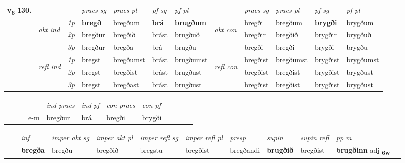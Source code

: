 \begin{tabular}{llllllllllll} \toprule
\multirow{4}{*}{{{\textbf{v{\textsubscript{6}}} \Large{\textbf{130.}}}}}  & &   &  \textit{praes sg}  & \textit{praes pl}  &\textit{ pf sg} & \textit{pf pl} &  &  \textit{praes sg}  & \textit{praes pl}  & \textit{pf sg} & \textit{pf pl } \\*
	\cmidrule{4-7} \cmidrule{9-12}
 & \multirow{3}{*}{\begin{turn}{90}\textit{akt ind}\end{turn}} & {\textit{1p}} & \textbf{bregð} & bregðum    & \textbf{brá} & \textbf{brugðum} & \multirow{3}{*}{\begin{turn}{90}\textit{akt con}\end{turn}} &bregði & bregðum & \textbf{brygði} & brygðum\\*
& &  {\textit{2p}} &  bregður  & bregðið   & brást & brugðuð & & bregðir & bregðið & brygðir & brygðuð \\*
& &  {\textit{3p}} & bregður & bregða   & brá & brugðu & & bregði & bregði& brygði & brygðu  \\*
\cmidrule{4-7} \cmidrule{9-12}
 &\multirow{3}{*}{\begin{turn}{90}\textit{refl ind}\end{turn}} & {\textit{1p}} & bregst & bregðumst    & brást & brugðumst & \multirow{3}{*}{\begin{turn}{90}\textit{refl con}\end{turn}}  &bregðist & bregðumst & brygðist & brygðumst\\*
 &&  {\textit{2p}} &  bregst  & bregðist   & brást & brugðust & &bregðist & bregðist & brygðist & brygðust \\*
& &  {\textit{3p}} & bregst & bregðast   & brást & brugðust & & bregðist & bregðist& brygðist & brygðust  \\*
\cmidrule{4-7} \cmidrule{9-12}
\end{tabular}


\begin{tabular}{llllllllllll}
 & &  & &  \textit{ind praes} & \textit{ind pf} & \textit{con praes} & \textit{con pf} \\*
&  & & e-m & bregður & brá & bregði & brygði \\*
\cmidrule{5-9}
\end{tabular}


\begin{tabular}{llllllllllll}
 & & \textit{inf} & \textit{imper akt sg} & \textit{imper akt pl} & \textit{imper refl sg} & \textit{imper refl pl} & \textit{presp} & \textit{supin} & \textit{supin refl} & \textit{pp m}     \\*
  & & \textbf{bregða} & bregðu  & bregðið & bregstu & bregðist & bregðandi &  \textbf{brugðið} & bregðist & \textbf{brugðinn} adj \textbf{\textsubscript{6w}} \\*
\cmidrule{1-12}
\end{tabular}



